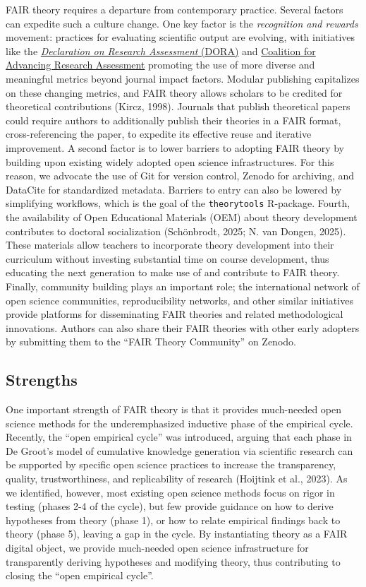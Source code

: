 \documentclass[man]{apa7}
\begin{document}
FAIR theory requires a departure from contemporary practice.
Several factors can expedite such a culture change.
One key factor is the \emph{recognition and rewards} movement:
practices for evaluating scientific output are evolving, with initiatives like the \href{https://sfdora.org/read/}{\emph{Declaration on Research Assessment} (DORA)} and \href{https://coara.eu/}{Coalition for Advancing Research Assessment}
promoting the use of more diverse and meaningful metrics beyond journal impact factors.
Modular publishing capitalizes on these changing metrics,
and FAIR theory allows scholars to be credited for theoretical contributions (Kircz, 1998).
Journals that publish theoretical papers could require authors to additionally publish their theories in a FAIR format, cross-referencing the paper,
to expedite its effective reuse and iterative improvement.
A second factor is to lower barriers to adopting FAIR theory by building upon existing widely adopted open science infrastructures.
For this reason, we advocate the use of Git for version control, Zenodo for archiving, and DataCite for standardized metadata.
Barriers to entry can also be lowered by simplifying workflows, which is the goal of the \texttt{theorytools} R-package.
Fourth, the availability of Open Educational Materials (OEM) about theory development contributes to doctoral socialization (Schönbrodt, 2025; N. van Dongen, 2025).
These materials allow teachers to incorporate theory development into their curriculum without investing substantial time on course development,
thus educating the next generation to make use of and contribute to FAIR theory.
Finally, community building plays an important role;
the international network of open science communities, reproducibility networks, and other similar initiatives provide platforms for disseminating FAIR theories and related methodological innovations.
Authors can also share their FAIR theories with other early adopters by submitting them to the ``FAIR Theory Community'' on Zenodo.

\subsection{Strengths}\label{strengths}

One important strength of FAIR theory is that it provides much-needed open science methods for the underemphasized inductive phase of the empirical cycle.
\label{openec}{Recently, the ``open empirical cycle'' was introduced, arguing that each phase in De Groot's model of cumulative knowledge generation via scientific research can be supported by specific open science practices to increase the transparency, quality, trustworthiness, and replicability of research (Hoijtink et al., 2023).
As we identified, however, most existing open science methods focus on rigor in testing (phases 2-4 of the cycle),
but few provide guidance on how to derive hypotheses from theory (phase 1), or how to relate empirical findings back to theory (phase 5), leaving a gap in the cycle.
By instantiating theory as a FAIR digital object,
we provide much-needed open science infrastructure for transparently deriving hypotheses and modifying theory,
thus contributing to closing the ``open empirical cycle''.}
\end{document}
